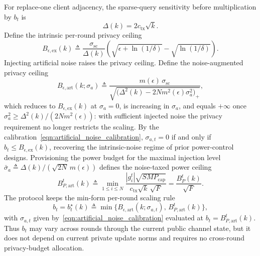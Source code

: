 \documentclass[journal]{IEEEtran}
\begin{document}
For replace-one client adjacency, the sparse-query sensitivity before multiplication by $b_t$ is
\begin{equation}
    \Delta(k)=2c_{\mathrm{tx}}\sqrt{k}.
\end{equation}
Define the intrinsic per-round privacy ceiling
\begin{equation}
    \label{eqn:per_round_privacy_ceiling}
    B_{\epsilon,\mathrm{ex}}(k)
    \triangleq
    \frac{\sigma_{\mathrm{sc}}}{\Delta(k)}
    \left(
    \sqrt{\epsilon+\ln(1/\delta)}-\sqrt{\ln(1/\delta)}
    \right).
\end{equation}
Injecting artificial noise raises the privacy ceiling. Define the noise-augmented privacy ceiling
\begin{equation}
    \label{eqn:privacy_ceiling_art}
    B_{\epsilon,\mathrm{art}}(k;\sigma_a)
    \triangleq
    \frac{m(\epsilon)\,\sigma_{\mathrm{sc}}}
    {\sqrt{\big(\Delta^2(k)-2N m^2(\epsilon)\sigma_a^2\big)_+}},
\end{equation}
which reduces to $B_{\epsilon,\mathrm{ex}}(k)$ at $\sigma_a=0$, is increasing in $\sigma_a$, and equals $+\infty$ once $\sigma_a^2\ge\Delta^2(k)/(2Nm^2(\epsilon))$: with sufficient injected noise the privacy requirement no longer restricts the scaling. By the calibration~\eqref{eqn:artificial_noise_calibration}, $\sigma_{a,t}=0$ if and only if $b_t\le B_{\epsilon,\mathrm{ex}}(k)$, recovering the intrinsic-noise regime of prior power-control designs. Provisioning the power budget for the maximal injection level $\bar\sigma_a\triangleq\Delta(k)/(\sqrt{2N}\,m(\epsilon))$ defines the noise-taxed power ceiling
\begin{equation}
    \label{eqn:power_ceiling_art}
    B_{P,\mathrm{art}}^t(k)
    \triangleq
    \min_{1\le i\le N}
    \frac{|g_i^t|\sqrt{SM P_{\mathrm{cap}}}}
    {c_{\mathrm{tx}}\sqrt{k}\,\sqrt{F}}
    =\frac{B_P^t(k)}{\sqrt F}.
\end{equation}
The protocol keeps the min-form per-round scaling rule
\begin{equation}
    \label{eqn:per_round_scaling}
    b_t=b_t^\star(k)
    \triangleq
    \min\big\{B_{\epsilon,\mathrm{art}}(k;\sigma_{a,t}),\,B_{P,\mathrm{art}}^t(k)\big\},
\end{equation}
with $\sigma_{a,t}$ given by~\eqref{eqn:artificial_noise_calibration} evaluated at $b_t=B_{P,\mathrm{art}}^t(k)$. Thus $b_t$ may vary across rounds through the current public channel state, but it does not depend on current private update norms and requires no cross-round privacy-budget allocation.
\end{document}
